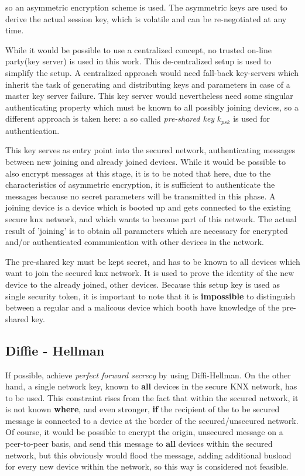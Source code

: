 so an asymmetric encryption scheme is used.
The asymmetric keys are used to derive the actual session key, which is volatile and can be re-negotiated at any time. 

While it would be possible to use a centralized concept, no trusted on-line party(key server) is used in this work. This de-centralized setup is used
to simplify the setup. A centralized approach would need fall-back key-servers
which inherit the task of generating and distributing keys and parameters in case of a master key server 
failure. This key server would nevertheless need some singular authenticating property which must be known
to all possibly joining devices, so a different approach is taken here: a so called \textit{pre-shared key} $k_{psk}$ is used for authentication. 

This key serves as entry point into the
secured network, authenticating messages between new joining and already joined devices. While it would be possible to also encrypt messages at this stage,
it is to be noted that here, due to the characteristics of asymmetric encryption, it is sufficient to authenticate
the messages because no secret parameters will be transmitted in this phase. A joining device is a device which
is booted up and gets connected to the existing secure knx network, and which wants to become part of this network. The actual
result of 'joining' is to obtain all parameters which are necessary for encrypted and/or authenticated communication with other
devices in the network.

The pre-shared key must be kept secret, and has to be known to all
devices which want to join the secured knx network. It is used to prove the identity of the new device to the already joined, other
devices. Because this setup key is used as single security token, it is important to note that it is \textbf{impossible} to distinguish between a regular and a malicous device which booth 
have knowledge of the pre-shared key.



\subsection{Diffie - Hellman}


If possible, achieve \textit{perfect forward secrecy} by using Diffi-Hellman. On the other hand,
a single network key, known to \textbf{all} devices in the secure KNX network, has to be used. This 
constraint rises from the fact that within the secured network, it is not known \textbf{where}, and even stronger,
\textbf{if} the recipient of the to be secured message is connected to a device at the border of the secured/unsecured 
network. Of course, it would be possible to 
encrypt the origin, unsecured message on a peer-to-peer basis, and send this message to \textbf{all} devices
within the secured network, but this obviously would flood the message, adding additional busload for every new
device within the network, so this way is considered not feasible.

